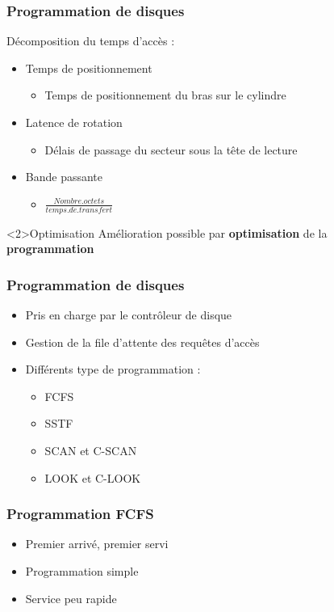 \begin{frame}
\frametitle{Programmation de disques}
Décomposition du temps d'accès :
\begin{itemize}
\item Temps de positionnement
\begin{itemize}
\item Temps de positionnement du bras sur le cylindre
\end{itemize}
\item Latence de rotation
\begin{itemize}
\item Délais de passage du secteur sous la tête de lecture
\end{itemize}
\item Bande passante
\begin{itemize}
\item $\frac{Nombre.octets}{temps.de.transfert}$
\end{itemize}
\end{itemize}

\begin{block}<2>{Optimisation}
Amélioration possible par \textbf{optimisation} de la \textbf{programmation}
\end{block}
\end{frame}

\begin{frame}
\frametitle{Programmation de disques}
\begin{itemize}
\item Pris en charge par le contrôleur de disque
\item Gestion de la file d'attente des requêtes d'accès
\item Différents type de programmation :
\begin{itemize}
\item FCFS
\item SSTF
\item SCAN et C-SCAN
\item LOOK et C-LOOK
\end{itemize}
\end{itemize}
\end{frame}

\begin{frame}
\frametitle{Programmation FCFS}
\begin{itemize}
\item Premier arrivé, premier servi
\item Programmation simple
\item Service peu rapide
\end{itemize}
\end{frame}


